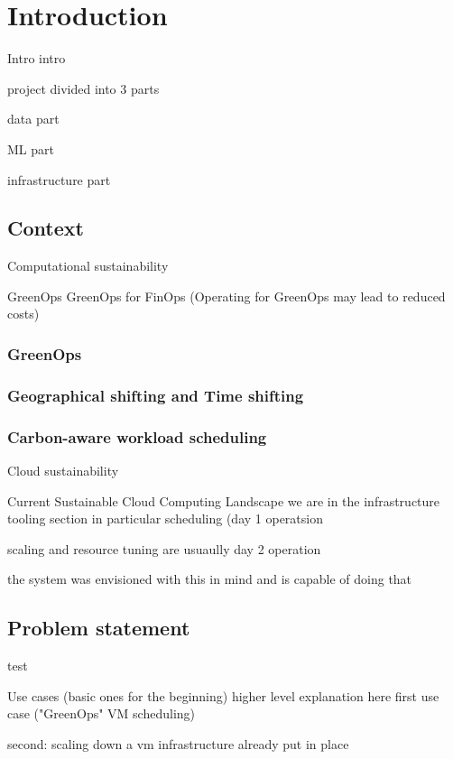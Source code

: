 \chapter{Introduction}
\label{cha:introduction}

Intro intro

project divided into 3 parts

data part

ML part

infrastructure part

\section{Context}
\label{sec:context}

Computational sustainability

GreenOps
GreenOps for FinOps
(Operating for GreenOps may lead to reduced costs)

\subsection{GreenOps}
\subsection{Geographical shifting and Time shifting}
\subsection{Carbon-aware workload scheduling}


Cloud sustainability

Current Sustainable Cloud Computing Landscape
we are in the infrastructure tooling section
in particular scheduling (day 1 operatsion

scaling and resource tuning are usuaully day 2 operation

the system was envisioned with this in mind and is capable of doing that


\section{Problem statement}
\label{sec:problem}

test


Use cases (basic ones for the beginning) higher level explanation here
first use case ("GreenOps" VM scheduling)

second: scaling down a vm 
infrastructure already put in place

